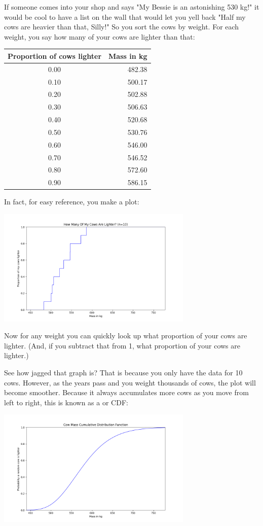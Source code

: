 If someone comes into your shop and says "My Bessie is an astonishing 530 kg!" it would be cool to have a list on the wall that would let you yell back "Half my cows are heavier than that, Silly!"  So you sort the cows by weight.  For each weight,  you say how many of your cows are lighter than that:

\begin{tabular}{c|r}
Proportion of cows lighter & Mass in kg \\
\hline
0.00 & 482.38 \\
0.10 & 500.17 \\
0.20 & 502.88 \\
0.30 & 506.63 \\
0.40 & 520.68 \\
0.50 & 530.76 \\
0.60 & 546.00 \\
0.70 & 546.52 \\
0.80 & 572.60 \\
0.90 & 586.15 \\
\end{tabular}

In fact, for easy reference,  you make a plot:

\includegraphics[width=0.7\textwidth]{cow_sample_cdf.png}

Now for any weight you can quickly look up what proportion of your cows are lighter.  (And, if you subtract that from 1,  what proportion of your cows are lighter.)

See how jagged that graph is?  That is because you only have the data for 10 cows.   However, as the years pass and you weight thousands of cows,  the plot will become smoother.   Because it
always accumulates more cows as you move from left to right,  this is known as a  or CDF:

\includegraphics[width=0.7\textwidth]{cow_cdf.png}

